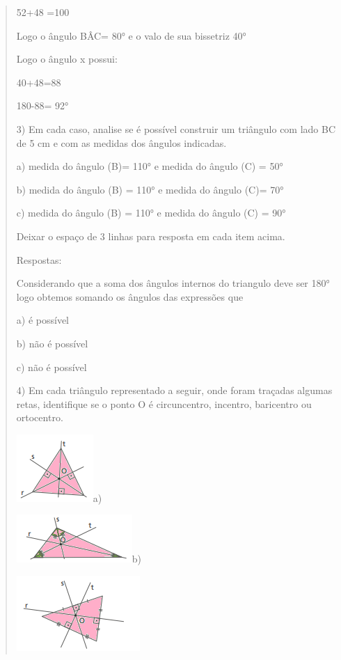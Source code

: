 \begin{quote}
\begin{escolha}
52+48 =100

Logo o ângulo BÂC= 80° e o valo de sua bissetriz 40°

Logo o ângulo x possui:

40+48=88

180-88= 92°

3) Em cada caso, analise se é possível construir um triângulo com lado
BC de 5 cm e com as medidas dos ângulos indicadas.

a) medida do ângulo (B)= 110° e medida do ângulo (C) = 50°

b) medida do ângulo (B) = 110° e medida do ângulo (C)= 70°

c) medida do ângulo (B) = 110° e medida do ângulo (C) = 90°

Deixar o espaço de 3 linhas para resposta em cada item acima.

Respostas:

Considerando que a soma dos ângulos internos do triangulo deve ser 180°
logo obtemos somando os ângulos das expressões que

a) é possível

b) não é possível

c) não é possível

4) Em cada triângulo representado a seguir, onde foram traçadas algumas
retas, identifique se o ponto O é circuncentro, incentro, baricentro ou
ortocentro.

\includegraphics[width=1.14583in,height=1.01042in]{./imgSAEB_8_MAT/media/image15.png}a)

\includegraphics[width=1.72917in,height=0.71875in]{./imgSAEB_8_MAT/media/image16.png}b)

\includegraphics[width=1.84375in,height=1.125in]{./imgSAEB_8_MAT/media/image17.png}


\end{escolha}
\end{quote}
